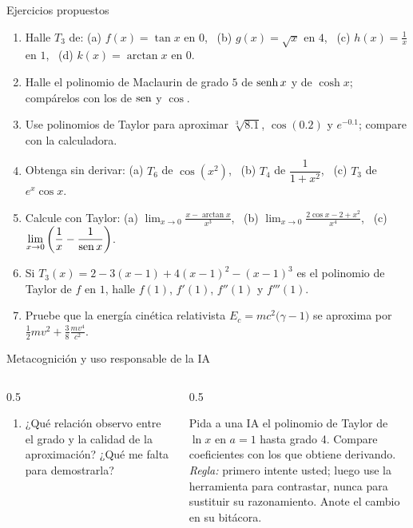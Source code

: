 \documentclass[10pt,aspectratio=169]{beamer}
\begin{document}
\begin{frame}{Ejercicios propuestos}
  \small
  \begin{ejercicio}
    \begin{enumerate}
      \item Halle $T_3$ de: (a) $f(x)=\tan x$ en $0$, \ (b) $g(x)=\sqrt x$ en $4$, \ (c) $h(x)=\frac1x$ en $1$, \ (d) $k(x)=\arctan x$ en $0$.
      \item Halle el polinomio de Maclaurin de grado $5$ de $\operatorname{senh} x$ y de $\cosh x$; compárelos con los de $\operatorname{sen}$ y $\cos$.
      \item Use polinomios de Taylor para aproximar $\sqrt[3]{8.1}$, $\cos(0.2)$ y $e^{-0.1}$; compare con la calculadora.
      \item Obtenga sin derivar: (a) $T_6$ de $\cos(x^2)$, \ (b) $T_4$ de $\dfrac{1}{1+x^2}$, \ (c) $T_3$ de $e^x\cos x$.
      \item Calcule con Taylor: (a) $\displaystyle\lim_{x\to0}\frac{x-\arctan x}{x^3}$, \ (b) $\displaystyle\lim_{x\to0}\frac{2\cos x-2+x^2}{x^4}$,
        \ (c) $\displaystyle\lim_{x\to0}\left(\frac1{x}-\frac1{\operatorname{sen} x}\right)$.
      \item Si $T_3(x)=2-3(x-1)+4(x-1)^2-(x-1)^3$ es el polinomio de Taylor de $f$ en $1$, halle $f(1)$, $f'(1)$, $f''(1)$ y $f'''(1)$.
      \item Pruebe que la energía cinética relativista $E_c=mc^2\big(\gamma-1\big)$ se aproxima por $\frac12mv^2+\frac38\frac{mv^4}{c^2}$.
    \end{enumerate}
  \end{ejercicio}
\end{frame}

\begin{frame}{Metacognición y uso responsable de la IA}
  \small
  \begin{columns}[t]
    \begin{column}{0.5\textwidth}
      \begin{metacog}
        \begin{enumerate}
          \metacomun
          \item ¿Qué relación observo entre el grado y la calidad de la aproximación? ¿Qué me falta para demostrarla?
        \end{enumerate}
      \end{metacog}
    \end{column}
    \begin{column}{0.5\textwidth}
      \begin{iabox}
        Pida a una IA el polinomio de Taylor de $\ln x$ en $a=1$ hasta grado 4. Compare coeficientes con los que obtiene derivando.\\[2pt]
        \textit{Regla:} primero intente usted; luego use la herramienta para contrastar, nunca para sustituir su razonamiento. Anote el cambio en su bitácora.
      \end{iabox}
    \end{column}
  \end{columns}
\end{frame}
\end{document}
